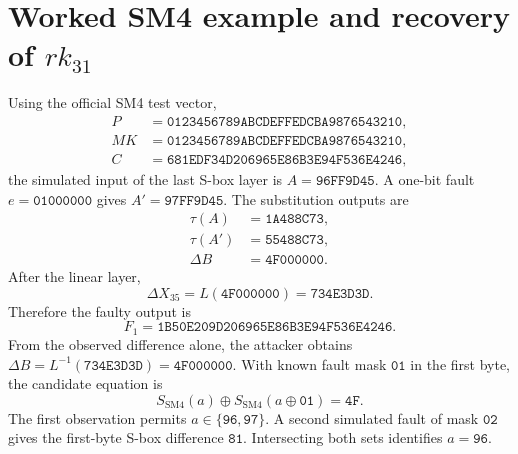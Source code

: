 \documentclass[11pt,a4paper]{report}
\newcommand{\hex}[1]{\texttt{#1}}
\newcommand{\xor}{\mathbin{\oplus}}
\begin{document}
\section{Worked SM4 example and recovery of $rk_{31}$}
Using the official SM4 test vector,
\begin{align*}
P&=\hex{0123456789ABCDEFFEDCBA9876543210},\\
MK&=\hex{0123456789ABCDEFFEDCBA9876543210},\\
C&=\hex{681EDF34D206965E86B3E94F536E4246},
\end{align*}
the simulated input of the last S-box layer is $A=\hex{96FF9D45}$. A one-bit fault $e=\hex{01000000}$ gives $A'=\hex{97FF9D45}$. The substitution outputs are
\begin{align*}
\tau(A)&=\hex{1A488C73},\\
\tau(A')&=\hex{55488C73},\\
\Delta B&=\hex{4F000000}.
\end{align*}
After the linear layer,
\begin{equation}
\Delta X_{35}=L(\hex{4F000000})=\hex{734E3D3D}.
\end{equation}
Therefore the faulty output is
\begin{equation}
F_1=\hex{1B50E209D206965E86B3E94F536E4246}.
\end{equation}
From the observed difference alone, the attacker obtains $\Delta B=L^{-1}(\hex{734E3D3D})=\hex{4F000000}$. With known fault mask $\hex{01}$ in the first byte, the candidate equation is
\begin{equation}
S_{\mathrm{SM4}}(a)\xor S_{\mathrm{SM4}}(a\xor\hex{01})=\hex{4F}.
\end{equation}
The first observation permits $a\in\{\hex{96},\hex{97}\}$. A second simulated fault of mask $\hex{02}$ gives the first-byte S-box difference $\hex{81}$. Intersecting both sets identifies $a=\hex{96}$.
\end{document}
